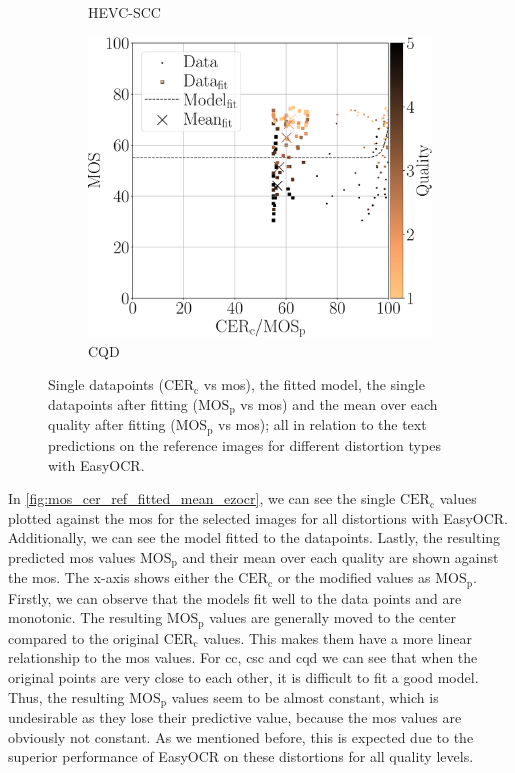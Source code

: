 \begin{figure}[h!]
\begin{subfigure}[b]{0.32\textwidth}
        \caption{HEVC-SCC}
        \label{fig:mos_cer_ref_fitted_mean_ezocr_HEVC-SCC}
    \end{subfigure}%
    \hfill
    \begin{subfigure}[b]{0.32\textwidth}
        \includegraphics[width=\textwidth]{../../images/analyze/mos_cer_ref_fitted_mean_ezocr_CQD.pdf}
        \caption{CQD}
        \label{fig:mos_cer_ref_fitted_mean_ezocr_CQD}
    \end{subfigure}%
    \caption{Single datapoints ($\text{CER}_{\text{c}}$ vs \gls{mos}), the fitted model, the single datapoints after fitting ($\text{MOS}_{\text{p}}$ vs \gls{mos}) and the mean over each quality after fitting ($\text{MOS}_{\text{p}}$ vs \gls{mos}); all in relation to the text predictions on the reference images for different distortion types with EasyOCR.}
\label{fig:mos_cer_ref_fitted_mean_ezocr}
\end{figure}

In \autoref{fig:mos_cer_ref_fitted_mean_ezocr}, we can see the single $\text{CER}_{\text{c}}$ values plotted against the \gls{mos} for the selected images for all distortions with EasyOCR.
Additionally, we can see the model fitted to the datapoints.
Lastly, the resulting predicted \gls{mos} values $\text{MOS}_{\text{p}}$ and their mean over each quality are shown against the \gls{mos}.
The x-axis shows either the $\text{CER}_{\text{c}}$ or the modified values as $\text{MOS}_{\text{p}}$.
Firstly, we can observe that the models fit well to the data points and are monotonic.
The resulting $\text{MOS}_{\text{p}}$ values are generally moved to the center compared to the original $\text{CER}_{\text{c}}$ values.
This makes them have a more linear relationship to the \gls{mos} values.
For \gls{cc}, \gls{csc} and \gls{cqd} we can see that when the original points are very close to each other, it is difficult to fit a good model.
Thus, the resulting $\text{MOS}_{\text{p}}$ values seem to be almost constant, which is undesirable as they lose their predictive value, because the \gls{mos} values are obviously not constant.
As we mentioned before, this is expected due to the superior performance of EasyOCR on these distortions for all quality levels.

